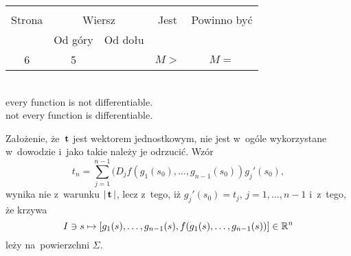 \documentclass[a4paper,11pt]{article}
\begin{document}


\begin{center}

  \begin{tabular}{|c|c|c|c|c|}
    \hline
    & \multicolumn{2}{c|}{} & & \\
    Strona & \multicolumn{2}{c|}{Wiersz} & Jest
                              & Powinno być \\ \cline{2-3}
    & Od góry & Od dołu & & \\
    \hline
    6   &  5 & & $M >$ & $M =$ \\
    \hline
  \end{tabular}

\end{center}

\noindent
{} \\
\Jest  every function is not differentiable. \\
\Powin not every function is differentiable. \\

\vspace{\spaceTwo}














\start {} Założenie, że~$\mathbf{t}$ jest wektorem jednostkowym, nie
jest w~ogóle wykorzystane w~dowodzie i~jako takie należy je odrzucić. Wzór
\begin{equation}
  \label{eq:MarcinkowskaWDTRRCz-01}
  t_{ n } =
  \sum_{ j = 1 }^{ n - 1 } ( D_{ j } f\left( g_{ 1 }( s_{ 0 } ), \ldots,
  g_{ n - 1 }( s_{ 0 } ) \right) g_{ j }'( s_{ 0 } ),
\end{equation}
wynika nie z~warunku $|\, {  \mathbf{t}  } \,|$, lecz z~tego,
iż $g_{ j }'( s_{ 0 } ) = t_{ j }$, $j = 1, \ldots, n - 1$ i~z~tego, że krzywa
\begin{equation}
  \label{eq:MarcinkowskaWDTRRCz-02}
  I \ni s \mapsto [ g_{ 1 }( s ), \ldots, g_{ n - 1 }( s ),
  f( g_{ 1 }( s ), \ldots, g_{ n - 1 }( s ) ) ] \in \mathbb{R}^{ n }
\end{equation}
leży na~powierzchni $\Sigma$.
\end{document}
